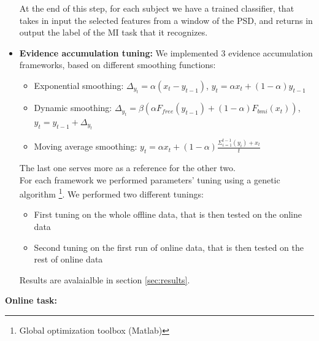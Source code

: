 \begin{itemize}
At the end of this step, for each subject we have a trained classifier, that takes in input the selected features from a window of the PSD, and returns in output the label of the MI task that it recognizes. \\
\item \textbf{Evidence accumulation tuning:} We implemented 3 evidence accumulation frameworks, based on different smoothing functions:
	\begin{itemize}
		\item Exponential smoothing: $\Delta_{y_t} = \alpha  (x_t - y_{t-1})$, $y_t = \alpha x_t +(1 - \alpha) y_{t-1}$
		\item Dynamic smoothing: $\Delta_{y_t} = \beta  (\alpha F_{free}(y_{t-1}) + (1 - \alpha) F_{bmi}(x_t))$, $y_t = y_{t-1} + \Delta_{y_t}$
		\item Moving average smoothing: $y_t = \alpha x_t +(1 - \alpha) \frac{\Sigma_{i=1}^{t-1}(y_i) + x_t}{t} $

	\end{itemize}
The last one serves more as a reference for the other two. \\
For each framework we performed parameters' tuning using a genetic algorithm \footnote{Global optimization toolbox (Matlab)}. We performed two different tunings:
	\begin{itemize}
		\item First tuning on the whole offline data, that is then tested on the online data
		\item Second tuning on the first run of online data, that is then tested on the rest of online data
	\end{itemize}
Results are avalaialble in section \ref{sec:results}.
\end{itemize}

\noindent
{\Large\textbf{Online task:}}

